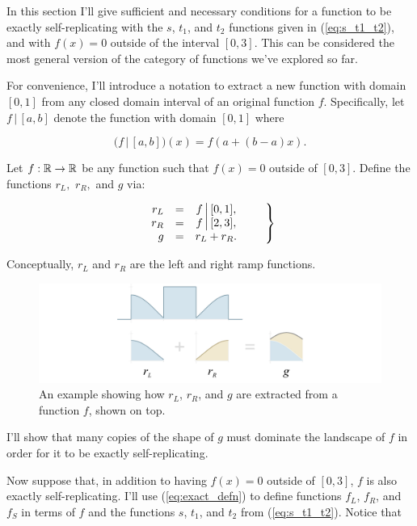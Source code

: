 \documentclass[20pt,]{extarticle}
\begin{document}
In this section I'll give sufficient and necessary conditions for a
function to be exactly self-replicating with the \(s\), \(t_1\), and
\(t_2\) functions given in (\ref{eq:s_t1_t2}), and with \(f(x)=0\)
outside of the interval \([0, 3]\). This can be considered the most
general version of the category of functions we've explored so far.

\newcommand{\restrict}{\,\big|\,}

For convenience, I'll introduce a notation to extract a new function
with domain \([0, 1]\) from any closed domain interval of an original
function \(f\). Specifically, let \(f \restrict [a, b]\) denote the
function with domain \([0,1]\) where

\[
\big(f \restrict [a,b]\big)(x) = f(a + (b-a)x).
\]

Let \(f:\mathbb{R}\to\mathbb{R}\) be any function such that \(f(x)=0\) outside of
\([0, 3]\). Define the functions \(r_L,\) \(r_R,\) and \(g\) via:

\begin{equation}\eqnset{\begin{array}{rlc}
r_L & = & f\restrict [0, 1], \\
r_R & = & f\restrict [2, 3], \\
g   & = & r_L + r_R.
\end{array}}\label{eq:rL_rR_g}\end{equation}

Conceptually, \(r_L\) and \(r_R\) are the left and right ramp functions.

\begin{figure}[htbp]
\centering
\includegraphics{images/pdfs/nonpl_setup.pdf}
\caption{\label{fig:nonpl_setup}An example showing how \(r_L\), \(r_R\),
and \(g\) are extracted from a function \(f\), shown on
top.}\label{fig:nonplux5fsetup}
\end{figure}

I'll show that many copies of the shape of \(g\) must dominate the
landscape of \(f\) in order for it to be exactly self-replicating.

Now suppose that, in addition to having \(f(x)=0\) outside of \([0,3]\),
\(f\) is also exactly self-replicating. I'll use (\ref{eq:exact_defn})
to define functions \(f_L\), \(f_R\), and \(f_S\) in terms of \(f\) and
the functions \(s\), \(t_1\), and \(t_2\) from (\ref{eq:s_t1_t2}).
Notice that
\end{document}
